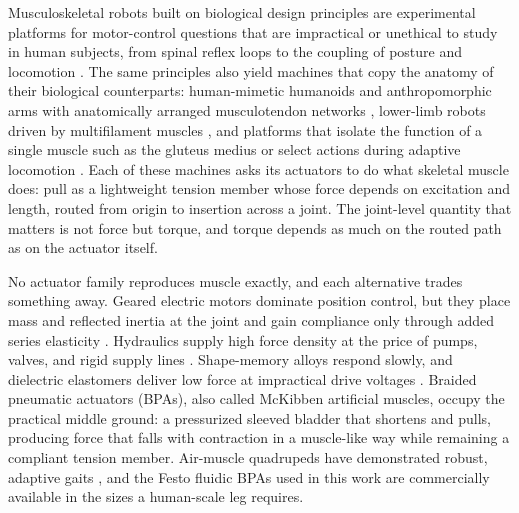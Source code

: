 Musculoskeletal robots built on biological design principles are experimental platforms for motor-control questions that are impractical or unethical to study in human subjects, from spinal reflex loops to the coupling of posture and locomotion \citep{ijspeert_amphibious_2020, goldsmith_investigating_2021, liu_robotic_2018}. The same principles also yield machines that copy the anatomy of their biological counterparts: human-mimetic humanoids and anthropomorphic arms with anatomically arranged musculotendon networks \citep{asano_design_2017, asano_musculoskeletal_2019, hitzmann_anthropomorphic_2018}, lower-limb robots driven by multifilament muscles \citep{kurumaya_musculoskeletal_2016}, and platforms that isolate the function of a single muscle such as the gluteus medius \citep{shin_constructive_2018} or select actions during adaptive locomotion \citep{schilling_adaptive_2022}. Each of these machines asks its actuators to do what skeletal muscle does: pull as a lightweight tension member whose force depends on excitation and length, routed from origin to insertion across a joint. The joint-level quantity that matters is not force but torque, and torque depends as much on the routed path as on the actuator itself.

No actuator family reproduces muscle exactly, and each alternative trades something away. Geared electric motors dominate position control, but they place mass and reflected inertia at the joint and gain compliance only through added series elasticity \citep{veale_towards_2016}. Hydraulics supply high force density at the price of pumps, valves, and rigid supply lines \citep{suzumori_trends_2018}. Shape-memory alloys respond slowly, and dielectric elastomers deliver low force at impractical drive voltages \citep{madden_artificial_2004}. Braided pneumatic actuators (BPAs), also called McKibben artificial muscles, occupy the practical middle ground: a pressurized sleeved bladder that shortens and pulls, producing force that falls with contraction in a muscle-like way while remaining a compliant tension member. Air-muscle quadrupeds have demonstrated robust, adaptive gaits \citep{aschenbeck_design_2006}, and the Festo fluidic BPAs used in this work are commercially available in the sizes a human-scale leg requires.

